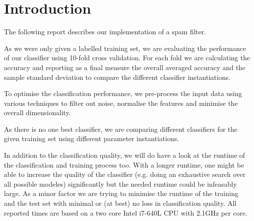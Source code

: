 \section{Introduction}
The following report describes our implementation of a spam filter.

As we were only given a labelled training set, we are evaluating the performance of our classifier using 10-fold cross validation.
For each fold we are calculating the accuracy and reporting as a final measure the overall averaged accuracy and the sample standard deviation to compare the different classifier instantiations.

To optimise the classification performance, we pre-process the input data using various techniques to filter out noise, normalise the features and minimise the overall dimensionality.

As there is no one best classifier, we are comparing different classifiers for the given training set using different parameter instantiations.

In addition to the classification quality, we will do have a look at the runtime of the classification and training process too.
With a longer runtime, one might be able to increase the quality of the classifier (e.g. doing an exhaustive search over all possible modeles) significantly but the needed runtime could be infeasably large.
As a minor factor we are trying to minimise the runtime of the training and the test set with minimal or (at best) no loss in classification quality.
All reported times are based on a two core Intel i7-640L CPU with 2.1GHz per core.


